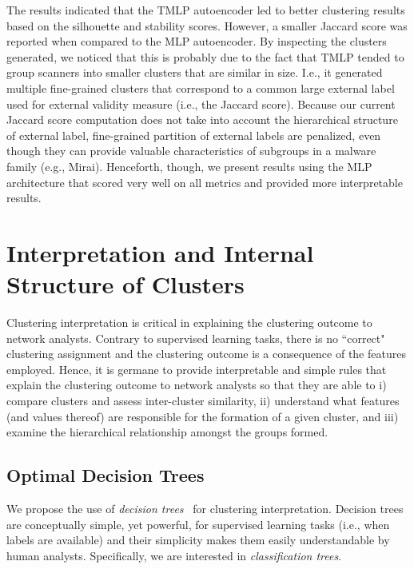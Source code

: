 \documentclass[manuscript, nonacm]{acmart}
\begin{document}
The results indicated that the TMLP autoencoder led to better clustering results based on the silhouette and stability scores.  
However, a smaller Jaccard score was reported when compared to the MLP autoencoder.
By inspecting the clusters generated, we  noticed 
that this is probably due to the fact that
TMLP tended to group scanners into smaller clusters that are similar in size.  
I.e., it generated multiple fine-grained clusters that correspond to a common large 
external label used for external validity measure (i.e., the Jaccard score).  Because our current Jaccard score 
computation does not take into account the hierarchical structure of external label, 
fine-grained partition of external labels are penalized, even though they can 
provide valuable characteristics of subgroups in a malware family (e.g., Mirai).
Henceforth, though, we present results using the MLP architecture that
scored very well on all metrics and 
provided more interpretable results. 


\section{Interpretation and Internal Structure of Clusters}
\label{sec:odt}

Clustering interpretation is critical in explaining the clustering outcome
to network analysts. Contrary to supervised learning tasks, there is no ``correct"
clustering assignment and the clustering outcome is a consequence of the features employed.
Hence, it is germane to provide interpretable and simple rules that explain the clustering outcome
to network analysts so that they are able 
to i) compare clusters and assess inter-cluster similarity,
ii) understand what features (and values thereof) are responsible for the formation of a given cluster,
and iii) examine the hierarchical relationship amongst the groups formed.

\subsection{Optimal Decision Trees}

We propose the use of \emph{decision trees}~\cite{hastie01statisticallearning} 
for clustering interpretation.
Decision trees are conceptually simple, yet powerful, 
for supervised learning tasks (i.e., when labels are available)
and their simplicity makes them easily understandable by human analysts. 
Specifically, we are interested in \emph{classification trees}.
\end{document}
